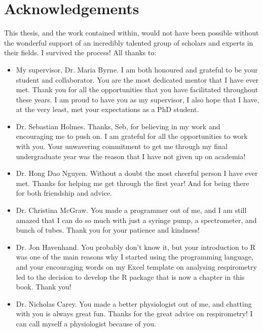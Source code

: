 
\SingleSpacing

\chapter*{Acknowledgements}

\OnehalfSpacing

This thesis, and the work contained within, would not have been possible without the wonderful support of an incredibly talented group of scholars and experts in their fields. I survived the process! All thanks to:

\begin{itemize}
  \item My supervisor, Dr. Maria Byrne. I am both honoured and grateful to be your student and collaborator. You are the most dedicated mentor that I have ever met. Thank you for all the opportunities that you have facilitated throughout these years. I am proud to have you as my supervisor, I also hope that I have, at the very least, met your expectations as a PhD student.
  \item Dr. Sebastian Holmes. Thanks, Seb, for believing in my work and encouraging me to push on. I am grateful for all the opportunities to work with you. Your unwavering commitment to get me through my final undergraduate year was the reason that I have not given up on academia!
  \item Dr. Hong Dao Nguyen. Without a doubt the most cheerful person I have ever met. Thanks for helping me get through the first year! And for being there for both friendship and advice. 
  \item Dr. Christina McGraw.  You made a programmer out of me, and I am still amazed that I can do so much with just a syringe pump, a spectrometer, and bunch of tubes. Thank you for your patience and kindness!
  \item Dr. Jon Havenhand. You probably don't know it, but your introduction to R was one of the main reasons why I started using the programming language, and your encouraging words on my Excel template on analysing respirometry led to the decision to develop the R package that is now a chapter in this book. Thank you!
  \item Dr. Nicholas Carey. You made a better physiologist out of me, and chatting with you is always great fun. Thanks for the great advice on respirometry! I can call myself a physiologist because of you.

\end{itemize}
